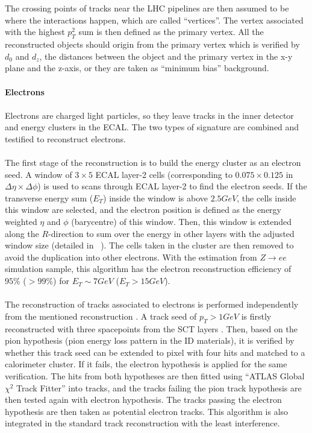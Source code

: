 \\
\\The crossing points of tracks near the LHC pipelines are then assumed to be where the interactions happen, which are called ``vertices''. The vertex associated with the highest $p_{T}^2$ sum is then defined as the primary vertex. All the reconstructed objects should origin from the primary vertex which is verified by $d_{0}$ and $d_z$, the distances between the object and the primary vertex in the x-y plane and the z-axis, or they are taken as ``minimum bias'' background.  
\\
\\{\bf Electrons}
\\
\\Electrons are charged light particles, so they leave tracks in the inner detector and energy clusters in the ECAL. The two types of signature are combined and testified to reconstruct electrons.
\\
\\The first stage of the reconstruction is to build the energy cluster as an electron seed. A window of $3 \times 5$ ECAL layer-2 cells (corresponding to $0.075 \times 0.125$ in $\Delta \eta \times \Delta \phi$) is used to scans through ECAL layer-2 to find the electron seeds. If the transverse energy sum ($E_{T}$) inside the window is above $2.5GeV$, the cells inside this window are selected, and the electron position is defined as the energy weighted $\eta$ and $\phi$ (barycentre) of this window. Then, this window is extended along the $R$-direction to sum over the energy in other layers with the adjusted window size (detailed in ~\cite{}). The cells taken in the cluster are then removed to avoid the duplication into other electrons. With the estimation from $Z\to ee$ simulation sample, this algorithm has the electron reconstruction efficiency of $95\%$ ($>99\%$) for $E_{T}\sim7GeV$ ($E_{T}>15GeV$).
\\
\\The reconstruction of tracks associated to electrons is performed independently from the mentioned reconstruction . A track seed of $p_{T}>1GeV$ is firstly reconstructed with three spacepoints from the SCT layers . Then, based on the pion hypothesis (pion energy loss pattern in the ID materials), it is verified by whether this track seed can be extended to pixel with four hits and matched to a calorimeter cluster. If it fails, the electron hypothesis is applied for the same verification. The hits from both hypotheses are then fitted using ``ATLAS Global $\chi^{2}$ Track Fitter'' into tracks, and the tracks failing the pion track hypothesis are then tested again with electron hypothesis. The tracks passing the electron hypothesis are then taken as potential electron tracks. This algorithm is also integrated in the standard track reconstruction with the least interference.
